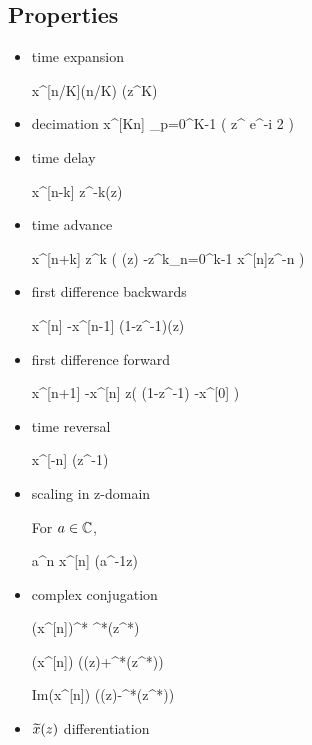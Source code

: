 \subsection{Properties}
\begin{itemize}
\item time expansion

\beq
x^{[n/K]}\indi(n/K\in\ZZ)
\maparrow{\calz}
(z^K)
\eeq

\item decimation
\beq
x^{[Kn]}
\maparrow{\calz}
\sum_{p=0}^{K-1}
\left(
z^{}
e^{-i 2\pi {}}
\right)
\eeq

\item time delay

\beq
x^{[n-k]}
\maparrow{\calz}
z^{-k}(z)
\quad {}
\eeq

\item time advance

\beq
x^{[n+k]}
\maparrow{\calz}
z^{k}
\left(
(z)
-z^k\sum_{n=0}^{k-1}
x^{[n]}z^{-n}
\right)
\quad {}
\eeq

\item first difference backwards

\beq
x^{[n]}
-x^{[n-1]}
\maparrow{\calz}
(1-z^{-1})(z)
\eeq

\item first difference forward

\beq
x^{[n+1]}
-x^{[n]}
\maparrow{\calz}
z\left( (1-z^{-1})
 -x^{[0]}
\right)
\eeq

\item time reversal

\beq
x^{[-n]}
\maparrow{\calz}
(z^{-1})
\eeq

\item scaling in z-domain

For $a\in{ \mathbb{C}}$,

\beq
a^n x^{[n]}
\maparrow{\calz}
(a^{-1}z)
\eeq

\item complex conjugation

\beq
(x^{[n]})^*
\maparrow{\calz} ^*(z^*)
\eeq

\beq
\Re(x^{[n]})
\maparrow{\calz}
((z)+^*(z^*))
\eeq

\beq
Im(x^{[n]})
\maparrow{\calz}
((z)-^*(z^*))
\eeq

\item ${\widetilde{x}}(z)$ differentiation


\end{itemize}
